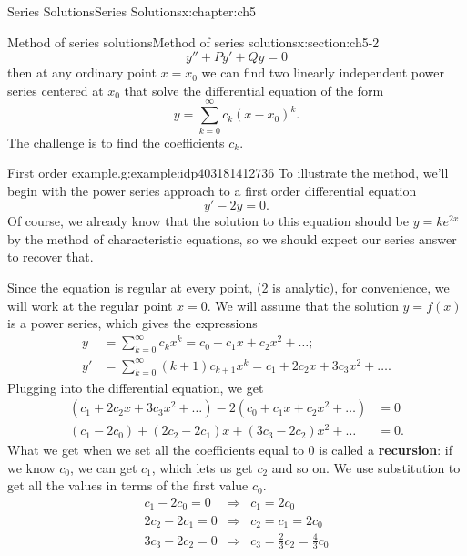\documentclass[oneside,10pt,]{book}
\newcommand{\terminology}[1]{\textbf{#1}}
\numberwithin{equation}{section}
\numberwithin{equation}{section}
\newcommand{\amp}{&}
\begin{document}
\begin{chapterptx}{Series Solutions}{}{Series Solutions}{}{}{x:chapter:ch5}
\begin{sectionptx}{Method of series solutions}{}{Method of series solutions}{}{}{x:section:ch5-2}
\begin{equation*}
y'' + P y' + Q y = 0
\end{equation*}
then at any ordinary point \(x = x_0\) we can find two linearly independent power series centered at \(x_0\) that solve the differential equation of the form%
\begin{equation*}
y = \sum_{k=0}^\infty c_k (x-x_0)^k.
\end{equation*}
The challenge is to find the coefficients \(c_k\).%
\begin{example}{First order example.}{g:example:idp403181412736}%
To illustrate the method, we'll begin with the power series approach to a first order differential equation%
\begin{equation*}
y' - 2y = 0.
\end{equation*}
Of course, we already know that the solution to this equation should be \(y = k e^{2x}\) by the method of characteristic equations, so we should expect our series answer to recover that.%
\par
Since the equation is regular at every point, (2 is analytic), for convenience, we will work at the regular point \(x = 0\). We will assume that the solution \(y = f(x)\) is a power series, which gives the expressions%
\begin{align*}
y \amp = \sum_{k=0}^\infty c_k x^k  = c_0 + c_1 x + c_2 x^2 + \ldots;\\
y' \amp = \sum_{k=0}^\infty (k+1) c_{k+1} x^k  = c_1 + 2c_2 x + 3c_3 x^2 + \ldots.
\end{align*}
Plugging into the differential equation, we get%
\begin{align*}
(c_1 + 2c_2 x + 3c_3 x^2 + \ldots) - 2(c_0 + c_1 x + c_2 x^2 + \ldots) \amp = 0\\
(c_1 - 2c_0) + (2c_2 - 2c_1)x + (3c_3 - 2c_2)x^2 + \ldots\amp = 0.
\end{align*}
What we get when we set all the coefficients equal to 0 is called a \terminology{recursion}: if we know \(c_0\), we can get \(c_1\), which lets us get \(c_2\) and so on. We use substitution to get all the values in terms of the first value \(c_0\).%
\begin{equation*}
\begin{array}{ccc}
c_1 - 2c_0 = 0 \amp \Rightarrow \amp c_1 = 2c_0 \\
2c_2 - 2c_1 = 0 \amp \Rightarrow \amp c_2 = c_1 = 2c_0 \\
3c_3 - 2c_2 = 0 \amp \Rightarrow \amp c_3 = \frac{2}{3}c_2 = \frac{4}{3}c_0 \\

\end{array}
\end{equation*}
\end{example}
\end{sectionptx}
\end{chapterptx}
\end{document}
